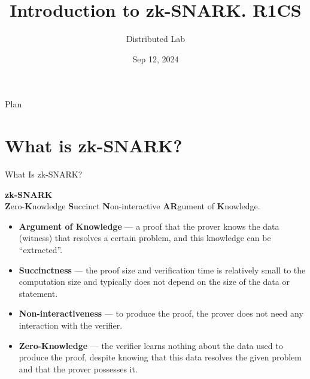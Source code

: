 \documentclass{zkdl-presentation-template}
\title[zk-SNARK I]{\textbf{Introduction to zk-SNARK. R1CS}}
\author{Distributed Lab}
\date{Sep 12, 2024}
\begin{document}
    \frame {
        \titlepage
    }

    \begin{frame}{Plan}
        \tableofcontents
    \end{frame}

    \section{What is zk-SNARK?}

    \begin{frame}{What Is zk-SNARK?}
        \begin{definition}
            \begin{center}
                \textbf{zk-SNARK} \\
                \textbf{Z}ero-\textbf{K}nowledge \textbf{S}uccinct \textbf{N}on-interactive \textbf{AR}gument of \textbf{K}nowledge.
            \end{center}
        \end{definition}

        \pause

        \begin{itemize}
            \item \textbf{Argument of Knowledge} --- a proof that the prover knows the data (witness) that resolves a certain
            problem, and this knowledge can be ``extracted''. \pause
            \item \textbf{Succinctness} --- the proof size and verification time is relatively small to the computation size and typically does not depend on the size of 
            the data or statement. \pause
            \item \textbf{Non-interactiveness} --- to produce the proof, the prover does not need any interaction
            with the verifier. \pause
            \item \textbf{Zero-Knowledge} --- the verifier learns nothing about the data used to produce the
            proof, despite knowing that this data resolves the given problem and that the prover possesses it.
        \end{itemize}
    \end{frame}
\end{document}
